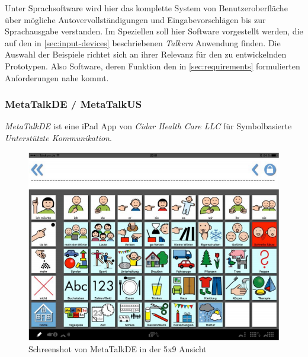     	Unter Sprachsoftware wird hier das komplette System von Benutzeroberfläche über mögliche Autovervollständigungen und Eingabevorschlägen bis zur Sprachausgabe verstanden. Im Speziellen soll hier Software vorgestellt werden, die auf den in \autoref{sec:input-devices} beschriebenen \emph{Talkern} Anwendung finden. Die Auswahl der Beispiele richtet sich an ihrer Relevanz für den zu entwickelnden Prototypen. Also Software, deren Funktion den in \autoref{sec:requirements} formulierten Anforderungen nahe kommt.
        
        \subsubsection*{MetaTalkDE / MetaTalkUS}
        	\emph{MetaTalkDE} ist eine iPad App von \emph{Cidar Health Care LLC} für Symbolbasierte \emph{Unterstützte Kommunikation}.
            
            \begin{figure}[H]
				\centering
				\includegraphics[width=.6\linewidth]{images/Metatalk.png}
                \caption{Schreenshot von MetaTalkDE in der 5x9 Ansicht
                	\parencite[S. 8]{cidar:metaTalkManual}
                }
				\label{fig:metatalk}
			\end{figure}
            
